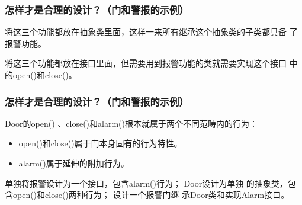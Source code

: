 \begin{frame}[fragile]
  \frametitle{怎样才是合理的设计？（门和警报的示例）}

  
  将这三个功能都放在抽象类里面，这样一来所有继承这个抽象类的子类都具备
  了报警功能。

  \pause
  

  将这三个功能都放在接口里面，但需要用到报警功能的类就需要实现这个接口
  中的open()和close()。

\end{frame}

\begin{frame}[fragile]
  \frametitle{怎样才是合理的设计？（门和警报的示例）}

  Door的open() 、close()和alarm()根本就属于两个不同范畴内的行为：

  \begin{itemize}
  \item open()和close()属于门本身固有的行为特性。
  \item alarm()属于延伸的附加行为。
  \end{itemize}

  \pause
  

   单独将报警设计为一个接口，包含alarm()行为； Door设计为单独
  的抽象类，包含open()和close()两种行为； 设计一个报警门继
  承Door类和实现Alarm接口。

\end{frame}



